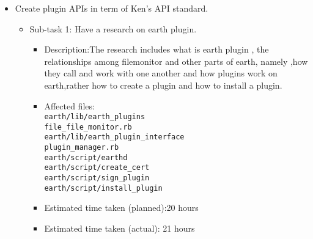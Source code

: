 \begin{itemize}
	\item Create plugin APIs in term of Ken's API standard.
	     \begin{itemize}
	        \item Sub-task 1: Have a research on earth plugin.
	           \begin{itemize}
				        \item Description:The research includes what is earth plugin , the relationships among filemonitor and other parts of earth, namely ,how they call and work with one another and how plugins work on earth,rather how to create a plugin and how to install a plugin.
                                        \item Affected files: \\
					 \texttt{earth/lib/earth\_plugins\\file\_file\_monitor.rb}\\
                                        \texttt{earth/lib/earth\_plugin\_interface\\plugin\_manager.rb}\\
                                        \texttt{earth/script/earthd}\\
                                        \texttt{earth/script/create\_cert}\\
                                        \texttt{earth/script/sign\_plugin}\\
                                        \texttt{earth/script/install\_plugin} \\
					\item Estimated time taken (planned):20 hours\\
					\item Estimated time taken  (actual): 21 hours\\
				\end{itemize}
                                \end{itemize}  


\end{itemize}

